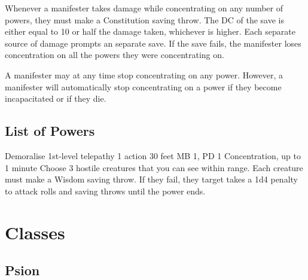 Whenever a manifester takes damage while
concentrating on any number of powers,
they must make a Constitution saving throw.
The DC of the save is either equal to 10 or half the damage taken,
whichever is higher.
Each separate source of damage prompts an separate save.
If the save fails,
the manifester loses concentration on all the powers they were
concentrating on.

A manifester may at any time stop concentrating on any power.
However, a manifester will automatically stop concentrating on a power
if they become incapacitated or if they die.

\section{List of Powers}

\DndPowerHeader%
  {Demoralise}
  {1st-level telepathy}
  {1 action}
  {30 feet}
  {MB 1, PD 1}
  {Concentration, up to 1 minute}
Choose 3 hostile creatures that you can see within range.
Each creature must make a Wisdom saving throw.
If they fail, they target takes a 1d4 penalty to attack rolls and
saving throws until the power ends.

\chapter{Classes}

\section{Psion}


